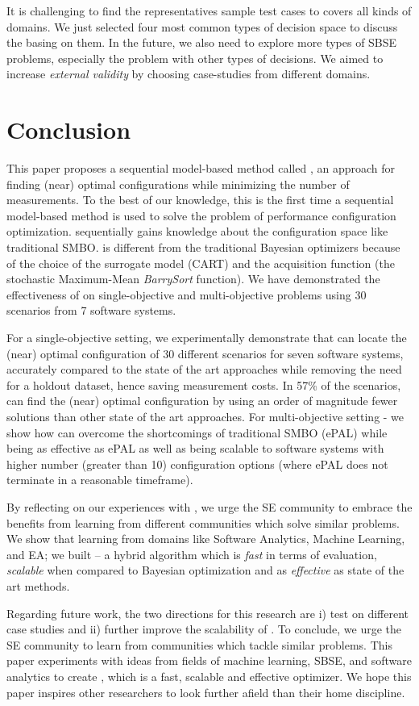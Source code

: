 It is challenging to find the representatives sample test cases to covers all kinds of domains. We just selected four most
common types of decision space to discuss the \flash basing on
them. In the future, we also need to explore more types of SBSE
problems, especially the problem with other types of decisions. We aimed to increase {\em external validity} by choosing case-studies from different domains. 

\section{Conclusion}

This paper proposes a sequential model-based method called \flash, an approach for finding (near) optimal configurations while minimizing the number of measurements. To the best of our knowledge, this is the first time a sequential model-based method is used to solve the problem of performance configuration optimization. \flash sequentially gains knowledge about the configuration space like traditional SMBO. \flash is different from the traditional Bayesian optimizers because of the choice of the surrogate model (CART) and the acquisition function (the stochastic Maximum-Mean {\em BarrySort} function). We have demonstrated the effectiveness of \flash on single-objective and multi-objective problems using 30 scenarios from 7 software systems.

For a single-objective setting, we experimentally demonstrate that \flash can locate the (near) optimal configuration of 30 different scenarios for seven software systems, accurately compared to the state of the art approaches while removing the need for a holdout dataset, hence saving measurement costs. In 57\% of the scenarios, \flash can find the (near) optimal configuration by using an order of magnitude fewer solutions than other state of the art approaches. For multi-objective setting - we show how \flash can overcome the shortcomings of traditional SMBO (ePAL) while being as effective as ePAL as well as being scalable to software systems with higher number (greater than 10) configuration options (where ePAL does not terminate in a reasonable timeframe).

By reflecting on our experiences with \flash, we urge the SE community to embrace the benefits from learning from different communities which solve similar problems. We show that learning from domains like Software Analytics, Machine Learning, and EA; we built \flash -- a hybrid algorithm which is \textit{fast} in terms of evaluation, \textit{scalable} when compared to Bayesian optimization and as \textit{effective} as state of the art methods.  

Regarding future work, the two directions for this research are i) test on different case studies and ii) further improve the scalability of \flash. To conclude, we urge the SE community to learn from communities which tackle similar problems. This paper experiments with ideas from fields of machine learning, SBSE, and software analytics to create \flash, which is a fast, scalable and effective optimizer. We hope this paper inspires other researchers to look further afield than their home discipline.

